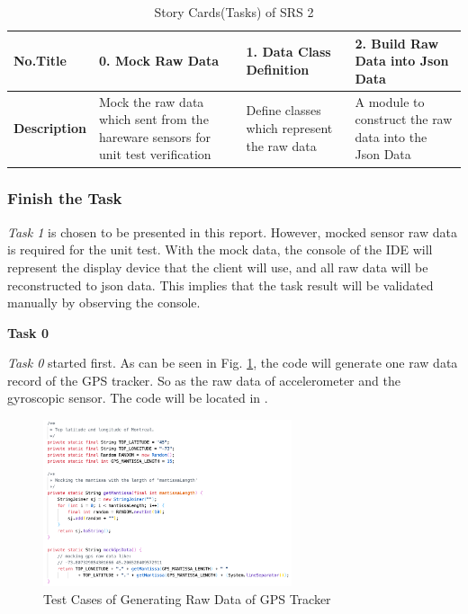 \documentclass[technote, transmag, onecolumn, 9pt]{IEEEtran}
\begin{document}
\begin{table}[!ht]
	\renewcommand{\arraystretch}{1.5}
	\caption{Story Cards(Tasks) of SRS 2}
	\label{tb:1}
	\centering
	\begin{tabular}{l | L{3cm} | L{3cm} | L{5cm}}
		\hline
		\textbf{No.Title}    & \textbf{0. Mock Raw Data}                                                         & \textbf{1. Data Class Definition}           & \textbf{2. Build Raw Data into Json Data}             \\
		\hline
		\textbf{Description} & Mock the raw data which sent from the hareware sensors for unit test verification & Define classes which represent the raw data & A module to construct the raw data into the Json Data \\
		\hline
	\end{tabular}
\end{table}

\subsubsection*{\textbf{Finish the Task}}

\textit{Task 1} is chosen to be presented in this report.
However, mocked sensor raw data is required for the unit test.
With the mock data, the console of the IDE will represent the display device
that the client will use, and all raw data will be reconstructed to json data.
This implies that the task result will be validated manually by observing the console.

\newpage
\textbf{Task 0}

\textit{Task 0} started first. As can be seen in Fig. \ref{fig:task0-testcase},
the code will generate one raw data record of the GPS tracker. So as the raw data of accelerometer and the gyroscopic sensor.
The code will be located in .

\begin{figure}[!ht]
	\centering
	\includegraphics[width=0.65\textwidth]{./img/f8-task0-testcase.png}
	\caption{Test Cases of Generating Raw Data of GPS Tracker}
	\label{fig:task0-testcase}
\end{figure}
\end{document}
